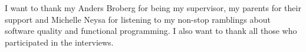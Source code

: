 \documentclass[12pt]{report}
\theoremstyle{definition}
\theoremstyle{theorem}
\begin{document}
I want to thank my Anders Broberg for being my supervisor, my parents for their
support and Michelle Neysa for listening to my non-stop ramblings about software
quality and functional programming. I also want to thank all those who participated in the interviews.

\clearpage\newpage
\thispagestyle{empty}

\tableofcontents
\newpage



















\end{document}
